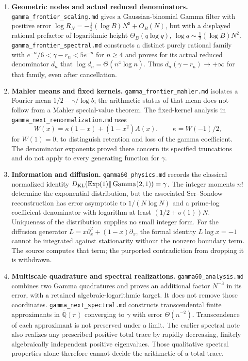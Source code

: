 \documentclass[11pt,a4paper]{article}
\newcommand{\Qbar}{\overline{\mathbb Q}}
\theoremstyle{definition}
\theoremstyle{remark}
\numberwithin{equation}{section}
\begin{document}
\begin{enumerate}
\item \textbf{Geometric nodes and actual reduced denominators.}
\texttt{gamma\_frontier\_scaling.md} gives a Gaussian-binomial
Gamma filter with positive error
$\log R_N=-\tfrac12(\log B)N^3+O_B(N)$, but with a displayed
rational prefactor of logarithmic height $\Theta_B(q\log q)$,
$\log q\sim\tfrac12(\log B)N^2$.
\texttt{gamma\_frontier\_spectral.md} constructs a distinct purely
rational family with
$e^{-n}/6<\gamma-r_n<5e^{-n}$ for $n\ge4$ and proves for its
actual reduced denominator $d_n$ that
$\log d_n=\Theta(n^4\log n)$.  Thus $d_n(\gamma-r_n)\to+\infty$
for that family, even after cancellation.

\item \textbf{Mahler means and fixed kernels.}
\texttt{gamma\_frontier\_mahler.md} isolates a Fourier mean
$1/2-\gamma/\log b$; the arithmetic status of that mean does not
follow from a Mahler special-value theorem.  The fixed-kernel analysis
in \texttt{gamma\_next\_renormalization.md} uses
\[
 W(x)=\kappa(1-x)+(1-x^2)A(x),\qquad \kappa=W(-1)/2,
\]
for $W(1)=0$, to distinguish retention and loss of the gamma coefficient.
The denominator exponents proved there concern its specified truncations
and do not apply to every generating function for $\gamma$.

\item \textbf{Information and diffusion.}
\texttt{gamma60\_physics.md} records the classical normalized identity
$D_{\rm KL}(\operatorname{Exp}(1)\Vert\operatorname{Gamma}(2,1))=\gamma$.
The integer moments $n!$ determine the exponential distribution, but the
associated Ser--Sondow reconstruction has error asymptotic to
$1/(N\log N)$ and a prime-log coefficient denominator with logarithm
at least $(1/2+o(1))N$.  Uniqueness of the distribution supplies no
small integer form.  For the diffusion generator
$L=x\partial_x^2+(1-x)\partial_x$, the formal identity
$L\log x=-1$ cannot be integrated against stationarity without the
nonzero boundary term.  The source computes that term; the purported
contradiction from dropping it is withdrawn.

\item \textbf{Multiscale quadrature and spectral realizations.}
\texttt{gamma60\_analysis.md} combines two Gamma quadratures and
proves an additional factor $N^{-3}$ in its error, with a retained
algebraic-logarithmic target.  It does not remove those coordinates.
\texttt{gamma\_next\_spectral.md} constructs transcendental finite
approximants in $\Qbar(\pi)$ converging to $\gamma$ with error
$\Theta(n^{-2})$.  Transcendence of each approximant is not preserved
under a limit.  The earlier spectral note also realizes any prescribed
positive total trace by rapidly decreasing, finitely algebraically
independent positive eigenvalues.  Those qualitative spectral properties
alone therefore cannot decide the arithmetic of a total trace.


\end{enumerate}
\end{document}
